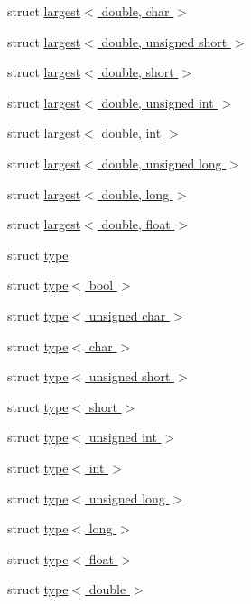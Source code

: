 \begin{DoxyCompactItemize}
\item 
struct \hyperlink{structcimg__library_1_1cimg_1_1largest_3_01double_00_01char_01_4}{largest$<$ double, char $>$}
\item 
struct \hyperlink{structcimg__library_1_1cimg_1_1largest_3_01double_00_01unsigned_01short_01_4}{largest$<$ double, unsigned short $>$}
\item 
struct \hyperlink{structcimg__library_1_1cimg_1_1largest_3_01double_00_01short_01_4}{largest$<$ double, short $>$}
\item 
struct \hyperlink{structcimg__library_1_1cimg_1_1largest_3_01double_00_01unsigned_01int_01_4}{largest$<$ double, unsigned int $>$}
\item 
struct \hyperlink{structcimg__library_1_1cimg_1_1largest_3_01double_00_01int_01_4}{largest$<$ double, int $>$}
\item 
struct \hyperlink{structcimg__library_1_1cimg_1_1largest_3_01double_00_01unsigned_01long_01_4}{largest$<$ double, unsigned long $>$}
\item 
struct \hyperlink{structcimg__library_1_1cimg_1_1largest_3_01double_00_01long_01_4}{largest$<$ double, long $>$}
\item 
struct \hyperlink{structcimg__library_1_1cimg_1_1largest_3_01double_00_01float_01_4}{largest$<$ double, float $>$}
\item 
struct \hyperlink{structcimg__library_1_1cimg_1_1type}{type}
\item 
struct \hyperlink{structcimg__library_1_1cimg_1_1type_3_01bool_01_4}{type$<$ bool $>$}
\item 
struct \hyperlink{structcimg__library_1_1cimg_1_1type_3_01unsigned_01char_01_4}{type$<$ unsigned char $>$}
\item 
struct \hyperlink{structcimg__library_1_1cimg_1_1type_3_01char_01_4}{type$<$ char $>$}
\item 
struct \hyperlink{structcimg__library_1_1cimg_1_1type_3_01unsigned_01short_01_4}{type$<$ unsigned short $>$}
\item 
struct \hyperlink{structcimg__library_1_1cimg_1_1type_3_01short_01_4}{type$<$ short $>$}
\item 
struct \hyperlink{structcimg__library_1_1cimg_1_1type_3_01unsigned_01int_01_4}{type$<$ unsigned int $>$}
\item 
struct \hyperlink{structcimg__library_1_1cimg_1_1type_3_01int_01_4}{type$<$ int $>$}
\item 
struct \hyperlink{structcimg__library_1_1cimg_1_1type_3_01unsigned_01long_01_4}{type$<$ unsigned long $>$}
\item 
struct \hyperlink{structcimg__library_1_1cimg_1_1type_3_01long_01_4}{type$<$ long $>$}
\item 
struct \hyperlink{structcimg__library_1_1cimg_1_1type_3_01float_01_4}{type$<$ float $>$}
\item 
struct \hyperlink{structcimg__library_1_1cimg_1_1type_3_01double_01_4}{type$<$ double $>$}
\end{DoxyCompactItemize}
